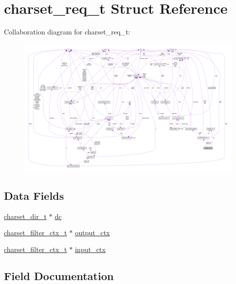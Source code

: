 \hypertarget{structcharset__req__t}{}\section{charset\+\_\+req\+\_\+t Struct Reference}
\label{structcharset__req__t}


Collaboration diagram for charset\+\_\+req\+\_\+t\+:
\nopagebreak
\begin{figure}[H]
\begin{center}
\leavevmode
\includegraphics[width=350pt]{structcharset__req__t__coll__graph}
\end{center}
\end{figure}
\subsection*{Data Fields}
\begin{DoxyCompactItemize}
\item 
\hyperlink{structcharset__dir__t}{charset\+\_\+dir\+\_\+t} $\ast$ \hyperlink{structcharset__req__t_a085a10e3c9d9a24e2f4e5600d1e322f2}{dc}
\item 
\hyperlink{structcharset__filter__ctx__t}{charset\+\_\+filter\+\_\+ctx\+\_\+t} $\ast$ \hyperlink{structcharset__req__t_ac23d1bbf83d1cce9ec00a85eb8ceac36}{output\+\_\+ctx}
\item 
\hyperlink{structcharset__filter__ctx__t}{charset\+\_\+filter\+\_\+ctx\+\_\+t} $\ast$ \hyperlink{structcharset__req__t_abd19442cbfb9cca08c343bc31296c111}{input\+\_\+ctx}
\end{DoxyCompactItemize}


\subsection{Field Documentation}
